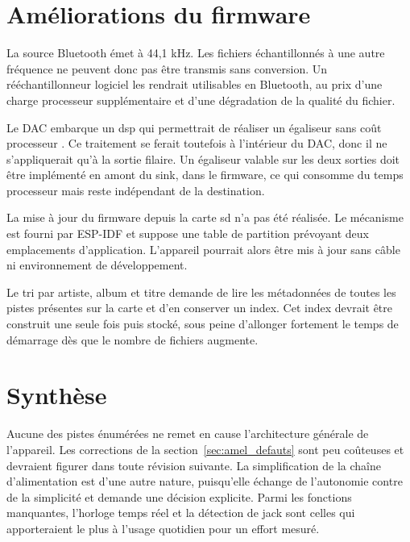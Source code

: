 \section{Améliorations du firmware}
\label{sec:amel_firmware}

La source Bluetooth émet à 44,1 kHz. Les fichiers échantillonnés à une autre fréquence ne peuvent donc pas être transmis sans conversion. Un rééchantillonneur logiciel les rendrait utilisables en Bluetooth, au prix d'une charge processeur supplémentaire et d'une dégradation de la qualité du fichier.

Le \gls{DAC} embarque un \gls{dsp} qui permettrait de réaliser un égaliseur sans coût processeur \cite{TI_PCM5242}. Ce traitement se ferait toutefois à l'intérieur du DAC, donc il ne s'appliquerait qu'à la sortie filaire. Un égaliseur valable sur les deux sorties doit être implémenté en amont du \gls{sink}, dans le firmware, ce qui consomme du temps processeur mais reste indépendant de la destination.

La mise à jour du firmware depuis la carte \gls{sd} n'a pas été réalisée. Le mécanisme est fourni par ESP-IDF \cite{ESP32_IDF_guide} et suppose une table de partition prévoyant deux emplacements d'application. L'appareil pourrait alors être mis à jour sans câble ni environnement de développement.

Le tri par artiste, album et titre demande de lire les métadonnées de toutes les pistes présentes sur la carte et d'en conserver un index. Cet index devrait être construit une seule fois puis stocké, sous peine d'allonger fortement le temps de démarrage dès que le nombre de fichiers augmente.

\section{Synthèse}
\label{sec:amel_synthese}

Aucune des pistes énumérées ne remet en cause l'architecture générale de l'appareil. Les corrections de la section~\ref{sec:amel_defauts} sont peu coûteuses et devraient figurer dans toute révision suivante. La simplification de la chaîne d'alimentation est d'une autre nature, puisqu'elle échange de l'autonomie contre de la simplicité et demande une décision explicite. Parmi les fonctions manquantes, l'horloge temps réel et la détection de jack sont celles qui apporteraient le plus à l'usage quotidien pour un effort mesuré.
